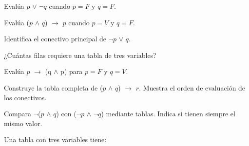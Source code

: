 \begin{activity}[id=dia-06-corta-02,type=short,weight=1]

Evalúa \(p\) \(\lor\) \(\neg q\) cuando \(p=F\) y \(q=F\).

\end{activity}

\begin{activity}[id=dia-06-corta-03,type=short,weight=1]

Evalúa (\(p\) \(\land\) \(q\)) \(\to\) \(p\) cuando \(p=V\) y \(q=F\).

\end{activity}

\begin{activity}[id=dia-06-corta-04,type=short,weight=1]

Identifica el conectivo principal de \(\neg p\) \(\lor\) \(q\).

\end{activity}

\begin{activity}[id=dia-06-corta-05,type=short,weight=1]

¿Cuántas filas requiere una tabla de tres variables?

\end{activity}

\begin{activity}[id=dia-06-corta-06,type=short,weight=1]

Evalúa \(p\) \(\to\) (q \(\land\) p) para \(p=F\) y \(q=V\).

\end{activity}

\begin{activity}[id=dia-06-desarrollo-01,type=long,weight=2]

Construye la tabla completa de (\(p\) \(\land\) \(q\)) \(\to\) \(r\). Muestra el orden de evaluación de los conectivos.

\end{activity}

\begin{activity}[id=dia-06-desarrollo-02,type=long,weight=2]

Compara \(\neg\)(\(p\) \(\land\) \(q\)) con (\(\neg p\) \(\land\) \(\neg q\)) mediante tablas. Indica si tienen siempre el mismo valor.

\end{activity}

\begin{activity}[id=dia-06-opcion-01,type=choice,weight=1]

Una tabla con tres variables tiene:





\end{activity}

